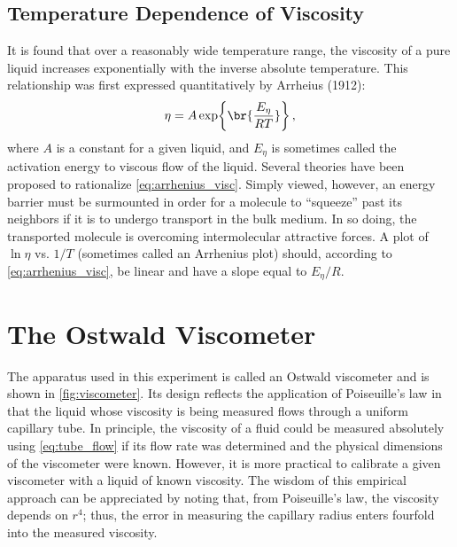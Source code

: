 \documentclass[nobib,nofonts,nols,nohyper]{tufte-handout}
\begin{document}
\subsection{Temperature Dependence of Viscosity} %
\label{sub:temperature_dependence_of_viscosity}

It is found that over a reasonably wide temperature range, the viscosity of a pure liquid increases exponentially with the inverse absolute temperature.
This relationship was first expressed quantitatively by Arrheius (1912):
\begin{equation}
	\eta = A \exp\br{\frac{E_\eta}{R T}} \, ,
	\label{eq:arrhenius_visc}
\end{equation}
where \( A \) is a constant for a given liquid, and \( E_\eta \) is sometimes called the activation energy to viscous flow of the liquid.
Several theories have been proposed to rationalize \cref{eq:arrhenius_visc}.
Simply viewed, however, an energy barrier must be surmounted in order for a molecule to ``squeeze'' past its neighbors if it is to undergo transport in the bulk medium.
In so doing, the transported molecule is overcoming intermolecular attractive forces.
A plot of \( \ln{\eta} \) vs. \( 1/T \) (sometimes called an Arrhenius plot) should, according to \cref{eq:arrhenius_visc}, be linear and have a slope equal to \( E_\eta / R \).



\section{The Ostwald Viscometer} %
\label{sec:the_ostwald_viscometer}

The apparatus used in this experiment is called an Ostwald viscometer and is shown in \cref{fig:viscometer}. 
Its design reflects the application of Poiseuille's law in that the liquid whose viscosity is being measured flows through a uniform capillary tube. 
In principle, the viscosity of a fluid could be measured absolutely using \cref{eq:tube_flow} if its flow rate was determined and the physical dimensions of the viscometer were known. 
However, it is more practical to calibrate a given viscometer with a liquid of known viscosity. 
The wisdom of this empirical approach can be appreciated by noting that, from Poiseuille's law, the viscosity depends on \( r^4 \); thus, the error in measuring the capillary radius enters fourfold into the measured viscosity.
\end{document}
